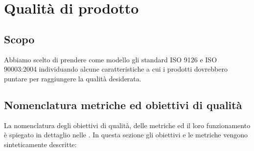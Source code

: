 
\section{Qualità di prodotto}\label{qualità di prodotto}

\subsection{Scopo}
Abbiamo scelto di prendere come modello gli standard ISO 9126 e ISO 90003:2004 individuando alcune caratteristiche a cui i prodotti dovrebbero puntare per raggiungere la qualità desiderata.

\subsection{Nomenclatura metriche ed obiettivi di qualità}	\label{nomenclaturaprodotti}
La nomenclatura degli obiettivi di qualità, delle metriche ed il loro funzionamento è spiegato in dettaglio nelle \NdPd. In questa sezione gli obiettivi e le metriche vengono sinteticamente descritte:

